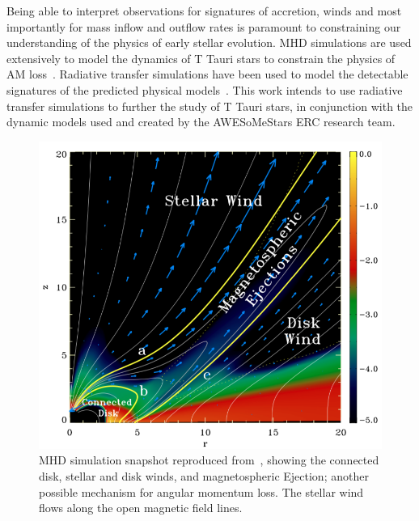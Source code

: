 \documentclass[fleqn,usenatbib]{mnras}
\begin{document}
Being able to interpret observations for signatures of accretion, winds and most importantly for mass inflow and outflow rates is paramount to constraining our understanding of the physics of early stellar evolution. MHD simulations are used extensively to model the dynamics of T Tauri stars to constrain the physics of AM loss~\citep[e.g.][]{2009A&A...508.1117Z,Matt:2008bj,2019A&A...624A..31C,Romanova:2002hc}. Radiative transfer simulations have been used to model the detectable signatures of the predicted physical models~\citep[e.g.][]{Esau:2014is,2012MNRAS.426.2901K,Kurosawa:2011fh,1998ApJ...492..743M,Hartmann:1994tl}. This work intends to use radiative transfer simulations to further the study of T Tauri stars, in conjunction with the dynamic models used and created by the AWESoMeStars ERC research team.
\begin{figure}
    \centering
    \includegraphics[width=\linewidth]{figures/zanni}
    \caption{MHD simulation snapshot reproduced from~\citet{2009A&A...508.1117Z}, showing the connected disk, stellar and disk winds, and magnetospheric Ejection; another possible mechanism for angular momentum loss. The stellar wind flows along the open magnetic field lines.}
    \label{fig:zanni}
\end{figure}
\end{document}
